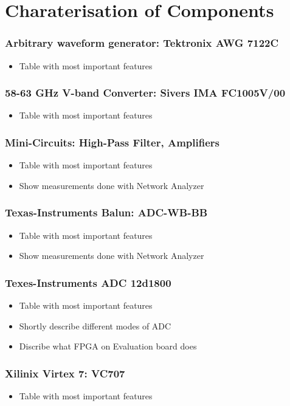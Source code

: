\chapter{Charaterisation of Components}
\subsection{Arbitrary waveform generator: Tektronix AWG 7122C}
\begin{itemize}
\item Table with most important features
\end{itemize}

\subsection{58-63 GHz V-band Converter: Sivers IMA FC1005V/00}
\begin{itemize}
\item Table with most important features
\end{itemize}

\subsection{Mini-Circuits: High-Pass Filter, Amplifiers}
\begin{itemize}
\item Table with most important features
\item Show measurements done with Network Analyzer
\end{itemize}

\subsection{Texas-Instruments Balun: ADC-WB-BB}
\begin{itemize}
\item Table with most important features
\item Show measurements done with Network Analyzer
\end{itemize}

\subsection{Texes-Instruments ADC 12d1800}
\begin{itemize}
\item Table with most important features
\item Shortly describe different modes of ADC
\item Discribe what FPGA on Evaluation board does
\end{itemize}

\subsection{Xilinix Virtex 7: VC707}
\begin{itemize}
\item Table with most important features
\end{itemize}
